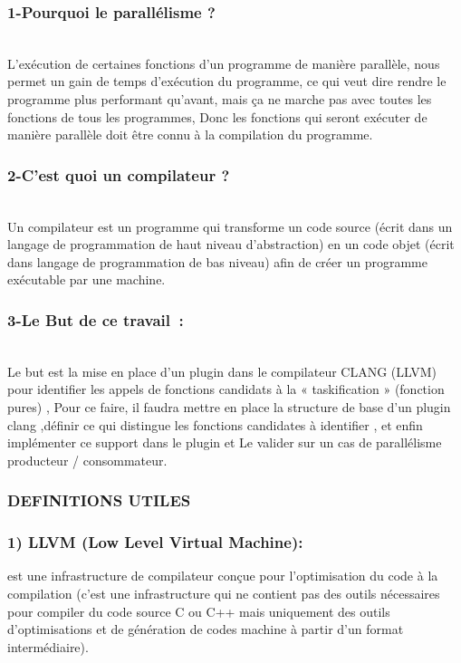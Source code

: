 \documentclass[12pt,titlepage]{report}
\begin{document}
\subsubsection{1-Pourquoi le parallélisme ?}

 
\\L’exécution de  certaines fonctions d'un programme de manière parallèle, nous permet un gain de temps d'exécution du programme, ce qui veut dire rendre le programme plus performant qu'avant, mais ça ne marche pas avec toutes  les fonctions de tous les programmes, Donc  les fonctions qui seront exécuter de manière parallèle doit être connu à la compilation du programme.\\

\subsubsection{2-C'est quoi un compilateur ?}


\\Un compilateur est un programme qui transforme un code source (écrit dans un langage de programmation de haut niveau d'abstraction) en un code objet (écrit dans langage de programmation de bas niveau) afin de créer un programme exécutable par une machine.\\


\subsubsection{3-Le But de ce travail :}



\\Le but est la mise en place d’un plugin dans le compilateur CLANG (LLVM) pour identifier les appels de fonctions candidats à la « taskification » (fonction pures) , Pour ce faire, il faudra mettre en place la structure de base d’un plugin clang ,définir ce qui distingue les fonctions candidates à identifier , et enfin implémenter ce support dans le plugin et  Le valider sur un cas de parallélisme producteur / consommateur.
\subsubsection{DEFINITIONS UTILES}
\subsubsection{1)  LLVM (Low Level Virtual Machine): } est une infrastructure de compilateur conçue pour l'optimisation du code à la compilation (c’est une infrastructure qui ne contient pas des outils nécessaires pour compiler du code source C ou C++ mais uniquement des outils d’optimisations et de génération de codes machine à partir d’un format intermédiaire).\\
\end{document}
